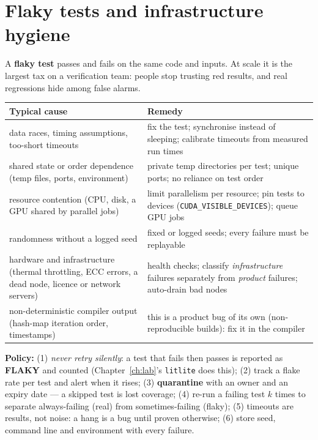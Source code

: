\documentclass[10pt,a4paper,openany,oneside]{report}
\newcommand{\prio}[1]{\texorpdfstring{\ifcase#1\or{\color{gold}\ding{72}}\or{\color{gold}\ding{72}\ding{72}}\or{\color{gold}\ding{72}\ding{72}\ding{72}}\fi}{}}
\begin{document}
\section{Flaky tests and infrastructure hygiene \prio{2}}
A \textbf{flaky test} passes and fails on the same code and inputs. At scale it is the largest tax on a verification team: people stop trusting red results, and real regressions hide among false alarms.
\begin{center}\small
\begin{xltabular}{\textwidth}{@{}L{4.3cm}Y@{}}
\toprule
\textbf{Typical cause} & \textbf{Remedy}\\
\midrule\endhead
data races, timing assumptions, too-short timeouts & fix the test; synchronise instead of sleeping; calibrate timeouts from measured run times\\
shared state or order dependence (temp files, ports, environment) & private temp directories per test; unique ports; no reliance on test order\\
resource contention (CPU, disk, a GPU shared by parallel jobs) & limit parallelism per resource; pin tests to devices (\texttt{CUDA\_VISIBLE\_DEVICES}); queue GPU jobs\\
randomness without a logged seed & fixed or logged seeds; every failure must be replayable\\
hardware and infrastructure (thermal throttling, ECC errors, a dead node, licence or network servers) & health checks; classify \emph{infrastructure} failures separately from \emph{product} failures; auto-drain bad nodes\\
non-deterministic compiler output (hash-map iteration order, timestamps) & this is a product bug of its own (non-reproducible builds): fix it in the compiler\\
\bottomrule
\end{xltabular}
\end{center}
\textbf{Policy:} (1) \emph{never retry silently}: a test that fails then passes is reported as \textbf{FLAKY} and counted (Chapter~\ref{ch:lab}'s \texttt{litlite} does this); (2) track a flake rate per test and alert when it rises; (3) \textbf{quarantine} with an owner and an expiry date --- a skipped test is lost coverage; (4) re-run a failing test $k$ times to separate always-failing (real) from sometimes-failing (flaky); (5) timeouts are results, not noise: a hang is a bug until proven otherwise; (6) store seed, command line and environment with every failure.
\end{document}
